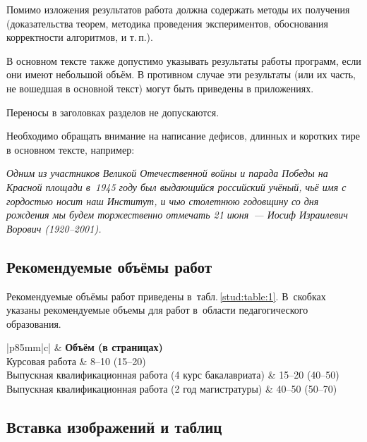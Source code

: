 \documentclass[14pt]{mmcs_article}
\begin{document}
Помимо изложения результатов работа должна содержать методы их получения (доказательства теорем, методика проведения экспериментов, обоснования корректности алгоритмов, и т.\,п.).

В основном тексте также допустимо указывать результаты работы программ, если они имеют небольшой объём. В противном случае эти результаты (или их часть, не вошедшая в основной текст) могут быть приведены в приложениях.


Переносы в заголовках разделов не допускаются.

Необходимо обращать внимание на написание дефисов, длинных и коротких тире в основном тексте, например:

\emph{Одним из участников Великой Отечественной войны и парада Победы на Красной площади в~1945 году был выдающийся российский учёный, чьё имя с гордостью носит наш Институт, и чью столетнюю годовщину со дня рождения мы будем торжественно отмечать 21 июня~--- Иосиф Израилевич Ворович (1920--2001).}


\subsection{Рекомендуемые объёмы работ}

Рекомендуемые объёмы работ приведены в~табл.\,\ref{stud:table:1}. В~скобках указаны рекомендуемые объемы для работ в~области педагогического образования.

\begin{table}[H]
  \centering

\caption{Рекомендуемые объёмы работ}\label{stud:table:1}

\begin{tabular}{|p{85mm}|c|}
  \hline
   &
   {\bf Объём (в страницах)} \\
  \hline
Курсовая работа	& 8--10 (15--20) \\
  \hline
Выпускная квалификационная работа\newline
(4 курс бакалавриата)	&  15--20 (40--50)\\
\hline
Выпускная квалификационная работа\newline
(2 год магистратуры)	&  40--50 (50--70) \\
\hline
\end{tabular}
\end{table}



\subsection{Вставка изображений и таблиц}
\end{document}

